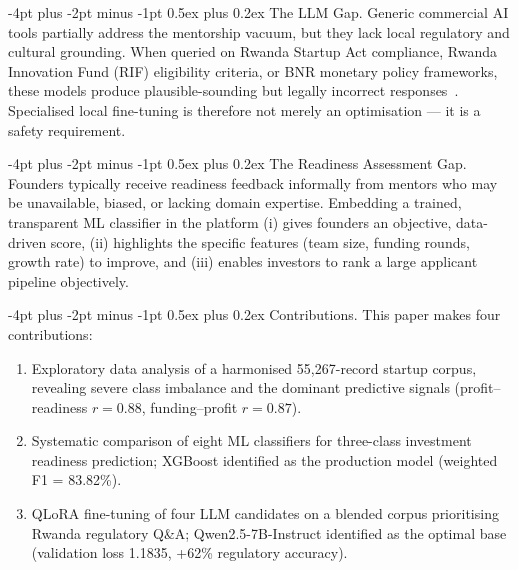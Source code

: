 \documentclass{article}
\makeatletter
\renewcommand\paragraph{\@startsection{paragraph}{4}{\z@}%
  {-4pt plus -2pt minus -1pt}%
  {0.5ex plus 0.2ex}%
  {\normalsize\bf}}
\makeatother
\begin{document}
\paragraph{The LLM Gap.}
Generic commercial AI tools partially address the mentorship
vacuum, but they lack local regulatory and cultural grounding.
When queried on Rwanda Startup Act compliance, Rwanda Innovation Fund (RIF)
eligibility criteria, or BNR monetary policy frameworks, these models produce
plausible-sounding but legally incorrect responses~\citep{ji2023hallucination}.
Specialised local fine-tuning is therefore not merely an optimisation ---
it is a safety requirement.

\paragraph{The Readiness Assessment Gap.}
Founders typically receive readiness feedback informally from mentors who
may be unavailable, biased, or lacking domain expertise.
Embedding a trained, transparent ML classifier in the platform
(i) gives founders an objective, data-driven score, (ii) highlights the
specific features (team size, funding rounds, growth rate) to improve, and
(iii) enables investors to rank a large applicant pipeline objectively.

\paragraph{Contributions.}
This paper makes four contributions:
\begin{enumerate}
    \item Exploratory data analysis of a harmonised 55{,}267-record startup
    corpus, revealing severe class imbalance and the dominant predictive signals
    (profit--readiness $r = 0.88$, funding--profit $r = 0.87$).

    \item Systematic comparison of eight ML classifiers for three-class
    investment readiness prediction; XGBoost identified as the production model
    (weighted F1 = 83.82\%).

    \item QLoRA fine-tuning of four LLM candidates on a blended corpus
    prioritising Rwanda regulatory Q\&A; Qwen2.5-7B-Instruct identified as
    the optimal base (validation loss 1.1835, +62\% regulatory accuracy).

\end{enumerate}

\end{document}
